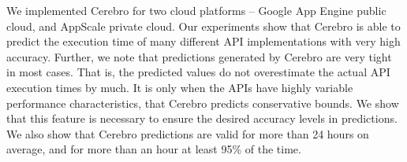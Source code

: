 We implemented Cerebro for two cloud platforms -- Google App Engine public cloud, and AppScale
private cloud. Our experiments show that Cerebro is able to predict the execution time
of many different API implementations with very high accuracy. 
Further, we note that
predictions generated by Cerebro are very tight in most cases. That is, the predicted values do not
overestimate the actual API execution times by much. It is only when the APIs have highly variable 
performance characteristics, that Cerebro predicts conservative bounds. We show that this feature 
is necessary to ensure the desired accuracy levels in predictions.
We also show that Cerebro predictions
are valid for more than 24 hours on average, and for more than an hour at least 95\% of the time.
